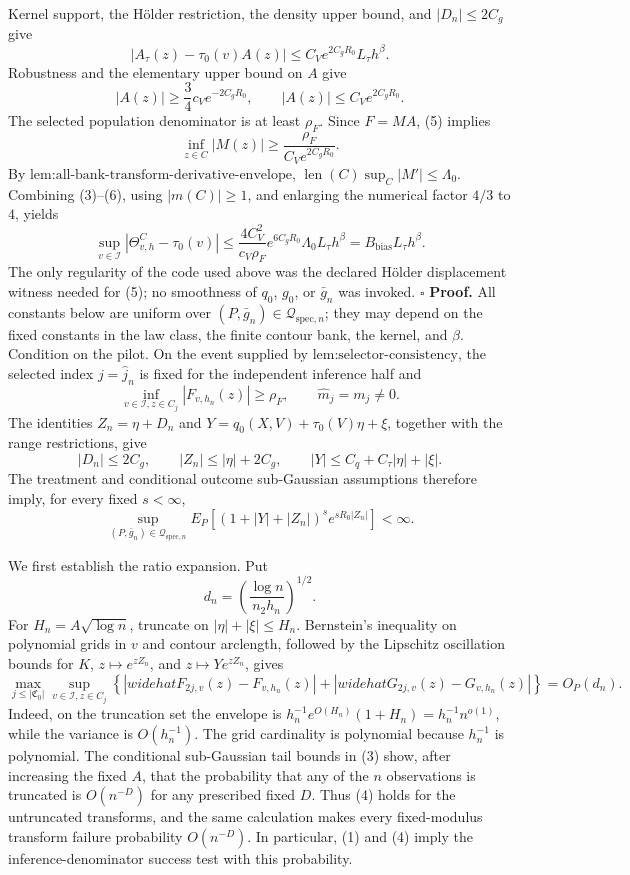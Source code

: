 Kernel support, the H\"older restriction, the density upper bound, and \(|D_n|\le2C_g\) give
\[
 |A_\tau(z)-\tau_0(v)A(z)|
 \le C_Ve^{2C_gR_0}L_\tau h^\beta. \tag{4}
\]
Robustness and the elementary upper bound on \(A\) give
\[
 |A(z)|\ge\frac34c_Ve^{-2C_gR_0},
 \qquad |A(z)|\le C_Ve^{2C_gR_0}. \tag{5}
\]
The selected population denominator is at least \(\rho_F\).  Since \(F=MA\), (5) implies
\[
 \inf_{z\in C}|M(z)|
 \ge\frac{\rho_F}{C_Ve^{2C_gR_0}}. \tag{6}
\]
By \(\text{lem:all-bank-transform-derivative-envelope}\),
\(\operatorname{len}(C)\sup_C|M'|\le\Lambda_0\).  Combining (3)--(6), using \(|m(C)|\ge1\), and enlarging the numerical factor \(4/3\) to \(4\), yields
\[
 \sup_{v\in\mathcal I}|\Theta^C_{v,h}-\tau_0(v)|
 \le \frac{4C_V^2}{c_V\rho_F}e^{6C_gR_0}\Lambda_0
 L_\tau h^\beta
 =B_{\mathrm{bias}}L_\tau h^\beta. \tag{7}
\]
The only regularity of the code used above was the declared H\"older displacement witness needed for (5); no smoothness of \(q_0\), \(g_0\), or \(\bar g_n\) was invoked. \(\square\)
\textbf{Proof.}
All constants below are uniform over \((P,\bar g_n)\in\mathcal Q_{\mathrm{spec},n}\); they may depend on the fixed constants in the law class, the finite contour bank, the kernel, and \(\beta\).  Condition on the pilot.  On the event supplied by \(\text{lem:selector-consistency}\), the selected index \(j=\widehat j_n\) is fixed for the independent inference half and
\[
 \inf_{v\in\mathcal I,z\in C_j}|F_{v,h_n}(z)|\ge\rho_F,
 \qquad \widehat m_j=m_j\ne0. \tag{1}
\]
The identities \(Z_n=\eta+D_n\) and \(Y=q_0(X,V)+\tau_0(V)\eta+\xi\), together with the range restrictions, give
\[
 |D_n|\le2C_g,
 \qquad |Z_n|\le|\eta|+2C_g,
 \qquad |Y|\le C_q+C_\tau|\eta|+|\xi|. \tag{2}
\]
The treatment and conditional outcome sub-Gaussian assumptions therefore imply, for every fixed \(s<\infty\),
\[
 \sup_{(P,\bar g_n)\in\mathcal Q_{\mathrm{spec},n}}
 E_P\!\left[(1+|Y|+|Z_n|)^s e^{sR_0|Z_n|}\right]<\infty. \tag{3}
\]

We first establish the ratio expansion.  Put
\[
 d_n=\left(\frac{\log n}{n_2h_n}\right)^{1/2}.
\]
For \(H_n=A\sqrt{\log n}\), truncate on \(|\eta|+|\xi|\le H_n\).  Bernstein's inequality on polynomial grids in \(v\) and contour arclength, followed by the Lipschitz oscillation bounds for \(K\), \(z\mapsto e^{zZ_n}\), and \(z\mapsto Ye^{zZ_n}\), gives
\[
 \max_{j\le|\mathfrak C_0|}\sup_{v\in\mathcal I,z\in C_j}
 \left\{|widehat F_{2j,v}(z)-F_{v,h_n}(z)|
 +|widehat G_{2j,v}(z)-G_{v,h_n}(z)|\right\}=O_P(d_n). \tag{4}
\]
Indeed, on the truncation set the envelope is
\(h_n^{-1}e^{O(H_n)}(1+H_n)=h_n^{-1}n^{o(1)}\), while the variance is \(O(h_n^{-1})\).  The grid cardinality is polynomial because \(h_n^{-1}\) is polynomial.  The conditional sub-Gaussian tail bounds in (3) show, after increasing the fixed \(A\), that the probability that any of the \(n\) observations is truncated is \(O(n^{-D})\) for any prescribed fixed \(D\).  Thus (4) holds for the untruncated transforms, and the same calculation makes every fixed-modulus transform failure probability \(O(n^{-D})\).  In particular, (1) and (4) imply the inference-denominator success test with this probability.


